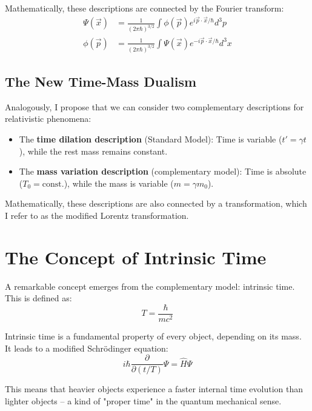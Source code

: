 \documentclass[a4paper,12pt]{article}
\begin{document}
	Mathematically, these descriptions are connected by the Fourier transform:
	\begin{align}
		\Psi(\vec{x}) &= \frac{1}{(2\pi\hbar)^{3/2}} \int \phi(\vec{p}) e^{i\vec{p}\cdot\vec{x}/\hbar} d^3p \\
		\phi(\vec{p}) &= \frac{1}{(2\pi\hbar)^{3/2}} \int \Psi(\vec{x}) e^{-i\vec{p}\cdot\vec{x}/\hbar} d^3x
	\end{align}
	
	\subsection{The New Time-Mass Dualism}
	
	Analogously, I propose that we can consider two complementary descriptions for relativistic phenomena:
	
	\begin{itemize}
		\item The \textbf{time dilation description} (Standard Model): Time is variable ($t' = \gamma t$), while the rest mass remains constant.
		\item The \textbf{mass variation description} (complementary model): Time is absolute ($T_0 = \text{const.}$), while the mass is variable ($m = \gamma m_0$).
	\end{itemize}
	
	Mathematically, these descriptions are also connected by a transformation, which I refer to as the modified Lorentz transformation.
	
	\section{The Concept of Intrinsic Time}
	
	A remarkable concept emerges from the complementary model: intrinsic time. This is defined as:
	\begin{equation}
		T = \frac{\hbar}{mc^2}
	\end{equation}
	
	Intrinsic time is a fundamental property of every object, depending on its mass. It leads to a modified Schrödinger equation:
	\begin{equation}
		i\hbar \frac{\partial}{\partial (t/T)} \Psi = \hat{H} \Psi
	\end{equation}
	
	This means that heavier objects experience a faster internal time evolution than lighter objects -- a kind of "proper time" in the quantum mechanical sense.
	
\end{document}
